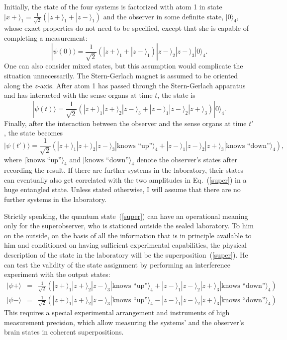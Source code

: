 \documentclass[12pt,a4]{article}
\begin{document}
Initially, the state of the four systems is factorized with atom 1 in state $|x+\rangle_1 = \frac{1}{\sqrt{2}} (|z+\rangle_1 + |z-\rangle_1)$ and the observer in some definite state, $|0\rangle_4$, whose exact properties do not need to be specified, except that she is capable of completing a measurement:
\begin{equation}
|\psi(0)\rangle = \frac{1}{\sqrt{2}} (|z+\rangle_1+|z-\rangle_1)|z-\rangle_2|z-\rangle_3|0\rangle_4.
\end{equation}
One can also consider mixed states, but this assumption would complicate the situation unnecessarily. The Stern-Gerlach magnet is assumed to be oriented along the $z$-axis. After atom 1 has passed through the Stern-Gerlach apparatus and has interacted with the sense organs at time $t$, the state is 
\begin{equation}
|\psi(t)\rangle = \frac{1}{\sqrt{2}} (|z+\rangle_1|z+\rangle_2|z-\rangle_3 +|z-\rangle_1|z-\rangle_2|z+\rangle_3 )|0\rangle_4.
\end{equation}
Finally, after the interaction between the observer and the sense organs at time $t'$, the state becomes
\begin{equation}
|\psi(t')\rangle = \frac{1}{\sqrt{2}} (|z+\rangle_1|z+\rangle_2|z-\rangle_3|\mbox{knows ``up''}\rangle_4 +|z-\rangle_1|z-\rangle_2|z+\rangle_3 |\mbox{knows ``down''}\rangle_4),\label{super}
\end{equation}
where $|\mbox{knows ``up''}\rangle_4$ and $|\mbox{knows ``down''}\rangle_4$ denote the observer's states after recording the result. If there are further systems in the laboratory, their states can eventually also get correlated with the two amplitudes in Eq.~(\ref{super}) in a huge entangled state. Unless stated otherwise, I will assume that there are no further systems in the laboratory. 

Strictly speaking, the quantum state~(\ref{super}) can have an operational meaning only for the superobserver, who is stationed outside the sealed laboratory. To him on the outside, on the basis of all the information that is in principle available to him and conditioned on having sufficient experimental capabilities, the physical description of the state in the laboratory will be the superposition~(\ref{super}). He can test the validity of the state assignment by performing an interference experiment with the output states:
\begin{eqnarray}
|\psi+\rangle &=&\frac{1}{\sqrt{2}} (|z+\rangle_1|z+\rangle_2|z-\rangle_3|\mbox{knows ``up''}\rangle_4 +|z-\rangle_1|z-\rangle_2|z+\rangle_3 |\mbox{knows ``down''}\rangle_4) \nonumber \\
|\psi- \rangle &=& \frac{1}{\sqrt{2}} (|z+\rangle_1|z+\rangle_2|z-\rangle_3|\mbox{knows ``up''}\rangle_4 - |z-\rangle_1|z-\rangle_2|z+\rangle_3 |\mbox{knows ``down''}\rangle_4). \nonumber
\end{eqnarray}
This requires a special experimental arrangement and instruments of high measurement precision, which allow measuring the systems' and the observer's brain states in coherent superpositions.
\end{document}
